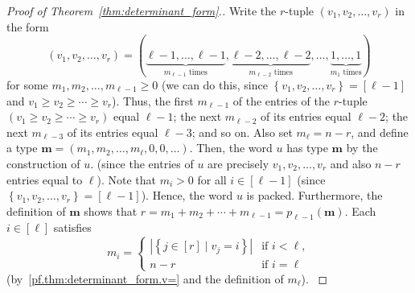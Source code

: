 \documentclass[reqno]{amsart}
\newcommand{\0}{\phantom{c}}
\newcommand{\mm}{\mathbf{m}}
\newcommand{\NN}{\mathbb{N}}
\newenvironment{verlong}{}{}
\newenvironment{vershort}{}{}
\newcommand{\set}[1]{\left\{ #1 \right\}}
\newcommand{\abs}[1]{\left| #1 \right|}
\newcommand{\tup}[1]{\left( #1 \right)}
\newcommand{\ive}[1]{\left[ #1 \right]}
\theoremstyle{plain}
\theoremstyle{definition}
\numberwithin{equation}{section}
\begin{document}
\begin{proof}[Proof of Theorem~\ref{thm:determinant_form}.]
Write the $r$-tuple $\tup{v_1, v_2, \dotsc, v_r}$ in the form
\begin{equation}
\label{pf.thm:determinant_form.v=}
\tup{v_1, v_2, \dotsc, v_r} = (
  \underbrace{\ell-1,\ldots,\ell-1}_{m_{\ell-1}\text{ times}},
  \underbrace{\ell-2,\ldots,\ell-2}_{m_{\ell-2}\text{ times}},
  \dotsc,
  \underbrace{1,\ldots,1}_{m_1\text{ times}}
)
\end{equation}
for some $m_1, m_2, \ldots, m_{\ell-1} \geq 0$
(we can do this, since $\set{v_1, v_2, \dotsc, v_r} = \ive{\ell-1}$ and $v_1 \geq v_2 \geq \cdots \geq v_r$).
\begin{verlong}
Thus, the first $m_{\ell-1}$ of the entries of the $r$-tuple $\tup{v_1 \geq v_2 \geq \cdots \geq v_r}$ equal $\ell-1$; the next $m_{\ell-2}$ of its entries equal $\ell-2$; the next $m_{\ell-3}$ of its entries equal $\ell-3$; and so on.
\end{verlong}
Also set $m_{\ell} = n - r$, and define a type $\mm = \tup{m_1, m_2, \dotsc, m_{\ell}, 0, 0, \ldots}$.
Then, the word $u$ has type $\mm$
\begin{vershort}
by the construction of $u$.
\end{vershort}
\begin{verlong}
(since the entries of $u$ are precisely $v_1, v_2, \dotsc, v_r$ and also $n-r$ entries equal to $\ell$).
\end{verlong}
Note that $m_i > 0$ for all $i \in \ive{\ell-1}$ (since $\set{v_1, v_2, \dotsc, v_r} = \ive{\ell-1}$).
Hence, the word $u$ is packed.
Furthermore, the definition of $\mm$ shows that $r = m_1 + m_2 + \cdots + m_{\ell-1} = p_{\ell-1}(\mm)$.
\begin{verlong}
Each $i \in \ive{\ell}$ satisfies
\[
m_i =
  \begin{cases}
  \abs{ \set{ j \in \ive{r} \mid v_j = i}} & \text{if } i < \ell,\\
  n - r & \text{if } i = \ell
  \end{cases}
\]
(by~\eqref{pf.thm:determinant_form.v=} and the definition of $m_{\ell}$).
\end{verlong}



\end{proof}
\end{document}
